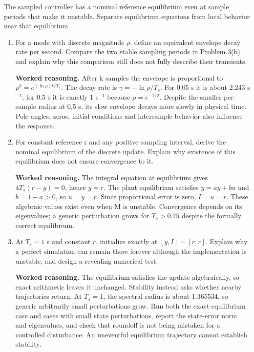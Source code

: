 \documentclass[10pt,a4paper]{article}
\newcommand{\task}[2]{\par\medskip{\color{ink}\Large\bfseries #1. #2}\par\smallskip}
\newcommand{\answer}{\par\smallskip\textbf{Worked reasoning.} }
\begin{document}
\newpage
\task{4}{An equilibrium is not a convergence guarantee}
The sampled controller has a nominal reference equilibrium even at sample periods that make it unstable. Separate equilibrium equations from local behavior near that equilibrium.
\begin{enumerate}
\item For a mode with discrete magnitude $\rho$, define an equivalent envelope decay rate per second. Compare the two stable sampling periods in Problem 3(b) and explain why this comparison still does not fully describe their transients.
\answer After k samples the envelope is proportional to $\rho^k=e^{(\ln\rho)t/T_s}$. The decay rate is $\gamma=-\ln\rho/T_s$. For 0.05 s it is about 2.243 s$^{-1}$; for 0.5 s it is exactly 1 s$^{-1}$ because $\rho=e^{-1/2}$. Despite the smaller per-sample radius at 0.5 s, its slow envelope decays more slowly in physical time. Pole angles, zeros, initial conditions and intersample behavior also influence the response.
\item For constant reference r and any positive sampling interval, derive the nominal equilibrium of the discrete update. Explain why existence of this equilibrium does not ensure convergence to it.
\answer The integral equation at equilibrium gives $4T_s(r-y)=0$, hence $y=r$. The plant equilibrium satisfies $y=ay+bu$ and $b=1-a>0$, so $u=y=r$. Since proportional error is zero, $I=u=r$. These algebraic values exist even when M is unstable. Convergence depends on its eigenvalues; a generic perturbation grows for $T_s>0.75$ despite the formally correct equilibrium.
\item At $T_s=1$ s and constant $r$, initialize exactly at $[y,I]=[r,r]$. Explain why a perfect simulation can remain there forever although the implementation is unstable, and design a revealing numerical test.
\answer The equilibrium satisfies the update algebraically, so exact arithmetic leaves it unchanged. Stability instead asks whether nearby trajectories return. At $T_s=1$, the spectral radius is about 1.365534, so generic arbitrarily small perturbations grow. Run both the exact-equilibrium case and cases with small state perturbations, report the state-error norm and eigenvalues, and check that roundoff is not being mistaken for a controlled disturbance. An uneventful equilibrium trajectory cannot establish stability.
\end{enumerate}
\end{document}
